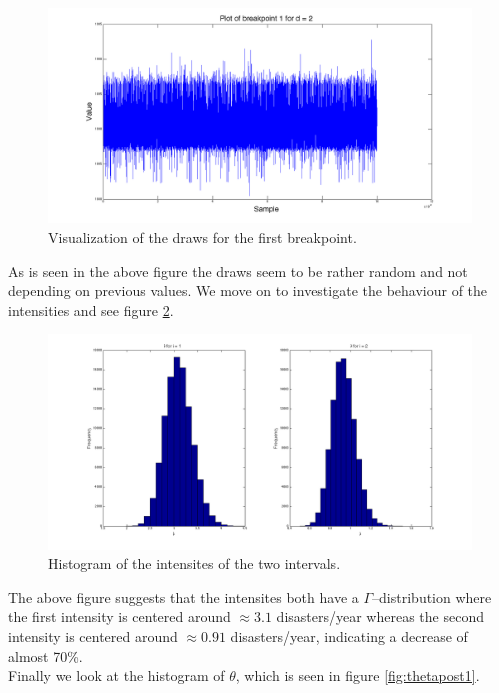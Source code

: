 \begin{figure}[H]
\centering
\includegraphics[scale=0.26]{./Figures/t1.png}
\caption{Visualization of the draws for the first breakpoint.}
\label{fig:t1}
\end{figure}

As is seen in the above figure the draws seem to be rather random and not depending on previous values.
We move on to investigate the behaviour of the intensities and see figure \ref{fig:lpost1}.

\begin{figure}[H]
\centering
\includegraphics[scale=0.26]{./Figures/lpost1.png}
\caption{Histogram of the intensites of the two intervals.}
\label{fig:lpost1}
\end{figure}

The above figure suggests that the intensites both have a $\Gamma$--distribution where the first intensity is centered around $\approx 3.1$ disasters/year whereas the second intensity is centered around $\approx 0.91$ disasters/year, indicating a decrease of almost 70\%. \\ Finally we look at the histogram of $\theta$, which is seen in figure \ref{fig:thetapost1}.

